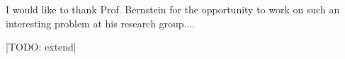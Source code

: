 \begin{acknowledgements}
I would like to thank Prof. Bernstein for the opportunity to work on such an interesting problem at his research group....

[TODO: extend]
\end{acknowledgements}
